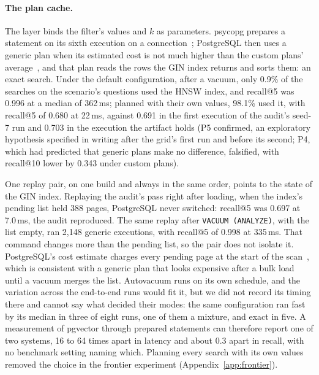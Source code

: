 \paragraph{The plan cache.}
The layer binds the filter's values and $k$ as parameters. psycopg prepares a statement on its sixth execution on a
connection~\cite{psycopg2026prepared}; PostgreSQL then uses a generic plan when its estimated cost is not much higher than the custom
plans' average~\cite{postgresql2026prepare}, and that plan reads the rows the GIN index returns and sorts them: an exact search. Under the default configuration, after a vacuum, only 0.9\% of the searches on
the scenario's questions used the HNSW index, and recall@5 was 0.996 at a median of 362\,ms; planned with their own values, 98.1\% used it, with
recall@5 of 0.680 at 22\,ms, against 0.691 in the first execution of the audit's seed-7 run and 0.703 in the execution the artifact holds (P5 confirmed, an exploratory hypothesis specified in writing after the grid's
first run and before its second; P4, which had predicted that generic plans make no difference, falsified, with recall@10 lower by 0.343 under custom
plans).

One replay pair, on one build and always in the same order, points to the state of the GIN index. Replaying the audit's pass right after loading, when the index's pending list held 388 pages,
PostgreSQL never switched: recall@5 was 0.697 at 7.0\,ms, the audit reproduced. The same replay after \texttt{VACUUM (ANALYZE)}, with the list empty, ran 2,148
generic executions, with recall@5 of 0.998 at 335\,ms. That command changes more than the pending list, so the pair does not isolate it. PostgreSQL's cost estimate charges every pending page at the start of the
scan~\cite{postgresql2026selfuncs}, which is consistent with a generic plan that looks expensive after a bulk load until a vacuum merges the list. Autovacuum runs on its own
schedule, and the variation across the end-to-end runs would fit it, but we did not record its timing there and cannot say what decided their modes: the same configuration ran
fast by its median in three of eight runs, one of them a mixture, and exact in five. A measurement of pgvector through prepared statements can therefore
report one of two systems, 16 to 64 times apart in latency and about 0.3 apart in recall, with no benchmark setting naming which. Planning
every search with its own values removed the choice in the frontier experiment (Appendix~\ref{app:frontier}).

